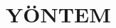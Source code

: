\documentclass[a4paper]{article}
\begin{document}
\section{YÖNTEM}

\begin{framed}
\lipsum[1-5]
\end{framed}
\end{document}
